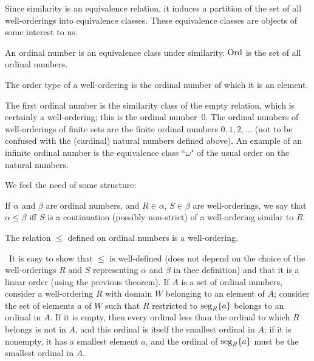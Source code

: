 Since similarity is an equivalence relation, it induces a
partition of the set of all well-orderings into equivalence classes.
These equivalence classes are objects of some interest to us.

\begin{definition}
 An {\upshape ordinal number} is an equivalence class under similarity.  $\mathrm{Ord}$ is the set of
 all ordinal numbers.
\end{definition}

\begin{definition}
 The {\upshape order type\/} of a well-ordering is the 
 ordinal number of which it is an element.
\end{definition}

The first ordinal number is the similarity class of the empty
relation, which is certainly a
well-ordering; this is the ordinal number~$0$.  The ordinal numbers of
well-orderings of finite sets are
the finite ordinal numbers $0, 1, 2,\ldots$ (not to be confused with the
(cardinal) natural numbers
defined above).  An example of an infinite ordinal
number is the equivalence class ``$\omega$" of the usual order on the natural numbers.

We feel the need of some structure:

\begin{definition}
 If $\alpha$ and $\beta$ are ordinal  numbers, and $R \in \alpha$, $S \in
 \beta$ are well-orderings, we say that $\alpha \leq \beta$ iff $S$ is a
 continuation (possibly non-strict) of a well-ordering
 similar to $R$.
\end{definition}

\begin{thm}
 The relation $\leq$ defined on ordinal numbers is a
 well-ordering.
\end{thm}

\preuve\ It is easy to show that $\leq$ is well-defined (does not depend on
the choice of the well-orderings $R$ and $S$ representing $\alpha$ and $\beta$
in thee definition) and that it is a linear order (using the previous
theorem).  If $A$ is a set of ordinal  numbers, consider a
well-ordering 
$R$ with domain $W$ belonging to an element of $A$; consider the
set of elements $a$ of $W$ such that $R$ restricted to
$\seg_R\{a\}\index{segment}$ belongs to an ordinal
in $A$.  If it is empty, then every ordinal less than the ordinal to
which $R$ belongs is not in $A$, and this ordinal is itself the smallest
ordinal in $A$; if it is nonempty, it has a smallest element $a$, and the
ordinal of $\mathop{\mathrm{seg}}_R\{a\}$ must be the smallest ordinal in $A$.
\finpreuve

